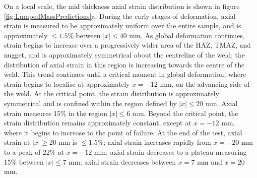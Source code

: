 On a local scale, the mid thickness axial strain distribution is shown in figure \ref{fig:LumpedMassPredictions}a. During the early stages of deformation, axial strain is measured to be approximately uniform over the entire sample, and is approximately $\leq 1.5$\% between $|x| \leq 40$ mm. As global deformation continues, strain begins to increase over a progressively wider area of the HAZ, TMAZ, and nugget, and is approximately symmetrical about the centreline of the weld; the distribution of axial strain in this region is increasing towards the centre of the weld. This trend continues until a critical moment in global deformation, where strain begins to localise at approximately $x = -12$ mm, on the advancing side of the weld. At the critical point, the strain distribution is approximately symmetrical and is confined within the region defined by $|x| \leq 20$ mm. Axial strain measures 15\% in the region $|x| \leq 6$ mm. Beyond the critical point, the strain distribution remains approximately constant, except at $x = -12$ mm, where it begins to increase to the point of failure. At the end of the test, axial strain at $|x| \geq 20$ mm is $\leq 1.5$\%; axial strain increases rapidly from $x = -20$ mm to a peak of 22\% at $x = -12$ mm; axial strain decreases to a plateau measuring 15\% between $|x| \leq 7$ mm; axial strain decreases between $x = 7$ mm and $x = 20$ mm.

